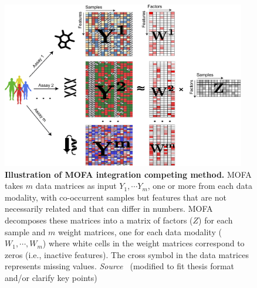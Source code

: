 \begin{figure}[!ht]
	\centering
	\includegraphics[width=0.95\textwidth]{Alg_MOFA/fig}
	\vspace{0.1cm}
	\caption[Illustration of MOFA integration competing method.]{\textbf{Illustration of MOFA integration competing method.} MOFA takes $m$ data matrices as input $Y_1, \cdots Y_m$, one or more from each data modality, with co-occurrent samples but features that are not necessarily related and that can differ in numbers. MOFA decomposes these matrices into a matrix of factors ($Z$) for each sample and $m$ weight matrices, one for each data modality ($W_1,\cdots, W_m$) where white cells in the weight matrices correspond to zeros (i.e., inactive features). The cross symbol in the data matrices represents missing values. \emph{Source ~\cite{tewari2017mofa}}(modified to fit thesis format and/or clarify key points) 
}
	\label{fig:Alg_MOFA}
\end{figure}



